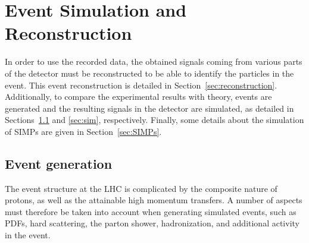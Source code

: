 \graphicspath{{chapt_dutch/}{intro/}{chapt2/}{chapt3/}{chapt4/}{chapt5/}}

\renewcommand\evenpagerightmark{{\scshape\small Chapter 4}}
\renewcommand\oddpageleftmark{{\scshape\small Event Simulation and Reconstruction}}

\hyphenation{}

\chapter{Event Simulation and Reconstruction}
\label{ch4}

In order to use the recorded data, the obtained signals coming from various parts of the detector must be reconstructed to be able to identify the particles in the event. This event reconstruction is detailed in Section~\ref{sec:reconstruction}. Additionally, to compare the experimental results with theory, events are generated and the resulting signals in the detector are simulated, as detailed in Sections~\ref{sec:generation} and \ref{sec:sim}, respectively. Finally, some details about the simulation of \acp{SIMP} are given in Section~\ref{sec:SIMPs}.

\section{Event generation}
\label{sec:generation}


The event structure at the \ac{LHC} is complicated by the composite nature of protons, as well as the attainable high momentum transfers. A number of aspects must therefore be taken into account when generating simulated events, such as \acp{PDF}, hard scattering, the parton shower, hadronization, and additional activity in the event.

